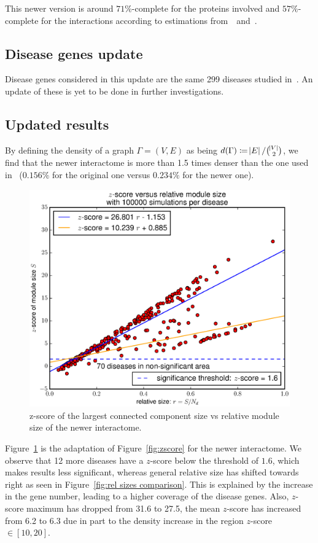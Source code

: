 \documentclass[letterpaper]{article}
\begin{document}
	This newer version is around $71\%$-complete for the proteins involved and $57\%$-complete for the interactions according
	to estimations from~\cite{estimatingTheSizeOfTheHumanInteractome}~and~\cite{ATruerMeasureOfOurIgnorance}.

	\subsection{Disease genes update}
	Disease genes considered in this update are the same 299 diseases studied in~\cite{originalPaper}. An update of these
	is yet to be done in further investigations.

	\subsection{Updated results}
	By defining the density of a graph $\Gamma = (V, E)$ as being $d(\Gamma) \coloneqq \abs E/\binom {\abs V}2$,
	we find that the newer interactome is more than 1.5 times denser than the one used in~\cite{originalPaper} ($0.156\%$
	for the original one versus $0.234\%$ for the newer one).

	\begin{figure}[!h]
		\includegraphics[width=.5\textwidth]{images/new_interactome_S4.b100000.eps}
		\caption{z-score of the largest connected component size vs relative module size of the newer interactome.
		\label{fig:new interactome zscore}}
	\end{figure}

	Figure~\ref{fig:new interactome zscore} is the adaptation of Figure~\ref{fig:zscore} for the newer interactome.
	We observe that 12 more diseases have a $z$-score below the threshold of $1.6$, which makes results less significant,
	whereas general relative size has shifted towards right as seen in Figure~\ref{fig:rel sizes comparison}. This
	is explained by the increase in the gene number, leading to a higher coverage of the disease genes. Also, $z$-score
	maximum has dropped from 31.6 to 27.5, the mean $z$-score has increased from 6.2 to 6.3 due in part to the density
	increase in the region $z$-score $\in [10, 20]$.
\end{document}
